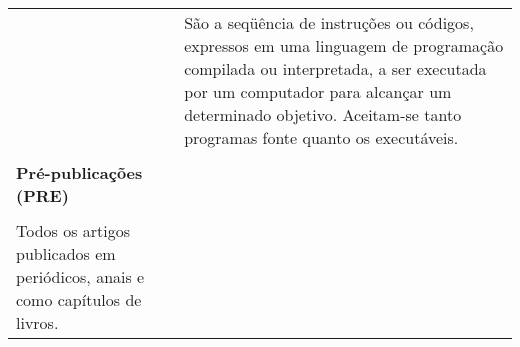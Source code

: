 \begin{table}
\begin{center}
\begin{tabularx}{\textwidth}{X X}
&	
São a seqüência de instruções ou códigos, expressos em uma linguagem de programação compilada ou interpretada, a ser executada por um computador para alcançar um determinado objetivo. Aceitam-se tanto programas fonte quanto os executáveis.\\
\\
\textbf{Pré-publicações (PRE)} \\
\\
Todos os artigos publicados em  periódicos, anais e como capítulos de livros. \\                 \end{tabularx}
  \end{center}
 \end{table}
